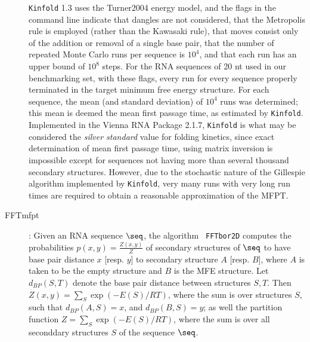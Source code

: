 \begin{description}
\begin{quote}
\end{quote}
{\tt Kinfold} 1.3 uses the Turner2004 energy model, and the flags in
the command line indicate that dangles are not considered, that the
Metropolis rule is employed (rather than the Kawasaki rule), that
moves consist only of the addition or removal of a single base pair,
that the number of repeated Monte Carlo runs per sequence is $10^4$,
and that each run has an upper bound of $10^8$ steps. For the RNA
sequences of 20 nt used in our benchmarking set, with these flags,
every run for every sequence properly terminated in the target minimum
free energy structure. For each sequence, the mean (and standard
deviation) of $10^4$ runs was determined; this mean is deemed the mean
first passage time, as estimated by {\tt Kinfold}. Implemented in the
Vienna RNA Package 2.1.7, {\tt Kinfold} is what may be considered the
{\em silver standard} value for folding kinetics, since exact
determination of mean first passage time, using matrix inversion is
impossible except for sequences not having more than several thousand
secondary structures. However, due to the stochastic nature of the
Gillespie algorithm implemented by {\tt Kinfold}, very many runs with
very long run times are required to obtain a reasonable approximation
of the MFPT.

\item[FFTmfpt]: Given an RNA sequence $\seq$, the algorithm {\tt
FFTbor2D} \cite{Senter.jmb14} computes the probabilities $p(x,y) =
\frac{Z(x,y)}{Z}$ of secondary structures of $\seq$ to have base pair
distance $x$ [resp. $y$] to secondary structure $A$ [resp. $B$], where
$A$ is taken to be the empty structure and $B$ is the MFE structure.
Let $d_{BP}(S,T)$ denote the base pair distance between structures
$S,T$. Then $Z(x,y) = \sum_S \exp(-E(S)/RT)$, where the sum is over
structures $S$, such that $d_{BP}(A,S)=x$, and $d_{BP}(B,S)=y$; as
well the partition function $Z =\sum_S \exp(-E(S)/RT)$, where the sum
is over all seconddary structures $S$ of the sequence $\seq$.


\end{description}
